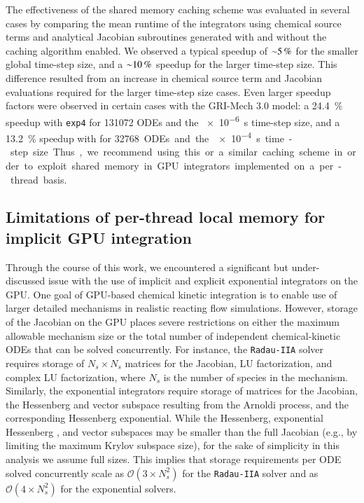 \documentclass[preprint]{elsarticle}
\begin{document}
The effectiveness of the shared memory caching scheme was evaluated in several cases by comparing the mean runtime of the integrators using chemical source terms and analytical Jacobian subroutines generated with and without the caching algorithm enabled.
We observed a typical speedup of $\SI{\sim5}{\percent}$ for the smaller global time-step size, and a $\SI{\sim10}{\percent}$ speedup for the larger time-step size.
This difference resulted from an increase in chemical source term and Jacobian evaluations required for the larger time-step size cases.
Even larger speedup factors were observed in certain cases with the GRI-Mech 3.0 model: a \SI{24.4}{\percent} speedup with \texttt{exp4} for \num{131072} ODEs and the \SI{e-6}{\second} time-step size, and a \SI{13.2}{\percent} speedup with  for \SI{32768} ODEs and the \SI{e-4}{\second} time-step size.
Thus, we recommend using this or a similar caching scheme in order to exploit shared memory in GPU integrators implemented on a per-thread basis.

\subsection{Limitations of per-thread local memory for implicit GPU integration}

Through the course of this work, we encountered a significant but under-discussed issue with the use of implicit and explicit exponential integrators on the GPU.
One goal of GPU-based chemical kinetic integration is to enable use of larger detailed mechanisms in realistic reacting flow simulations.
However, storage of the Jacobian on the GPU places severe restrictions on either the maximum allowable mechanism size or the total number of independent chemical-kinetic ODEs that can be solved concurrently.
For instance, the \texttt{Radau-IIA} solver requires storage of $N_s \times N_s$ matrices for the Jacobian, LU factorization, and complex LU factorization, where $N_s$ is the number of species in the mechanism.
Similarly, the exponential integrators require storage of matrices for the Jacobian, the Hessenberg and vector subspace resulting from the Arnoldi process, and the corresponding Hessenberg exponential.
While the Hessenberg, exponential Hessenberg , and vector subspaces may be smaller than the full Jacobian (e.g., by limiting the maximum Krylov subspace size), for the sake of simplicity in this analysis we assume full sizes.
This implies that storage requirements per ODE solved concurrently scale as $\mathcal{O}\left(3 \times N_s^2\right)$ for the \texttt{Radau-IIA} solver and as $\mathcal{O}\left(4 \times N_s^2\right)$ for the exponential solvers.
\end{document}
